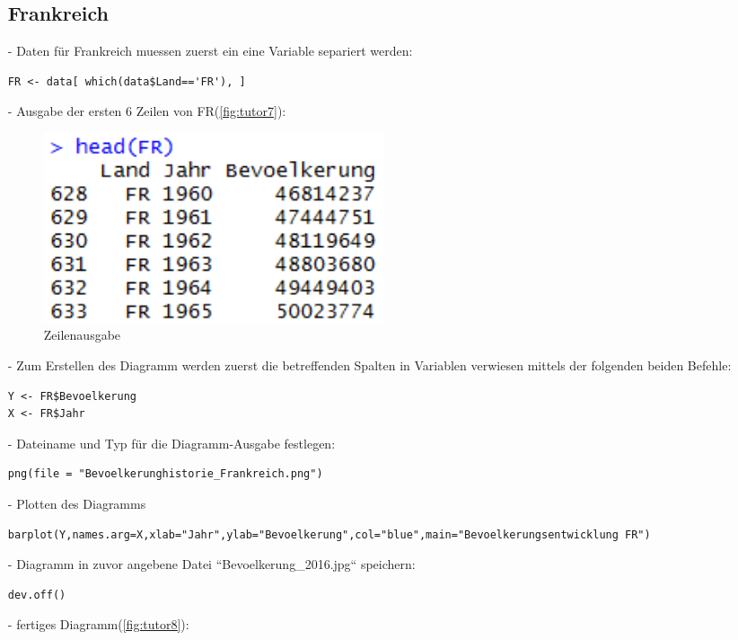 \begin{itemize}
\subsection*{Frankreich}
\item[-]Daten für Frankreich muessen zuerst ein eine Variable separiert werden:
\begin{lstlisting}
FR <- data[ which(data$Land=='FR'), ]
\end{lstlisting}
\item[-]Ausgabe der ersten 6 Zeilen von FR(\autoref{fig:tutor7}):
\begin{figure}[!htb]
        \begin{minipage}{1\textwidth}
                \centering
                \includegraphics[width=0.50\textwidth]{pics/tutor7.png}\par\vspace{0cm}
                \caption{Zeilenausgabe}
                \label{fig:tutor7}
        \end{minipage}
\end{figure}
\item[-]Zum Erstellen des Diagramm werden zuerst die betreffenden Spalten in Variablen verwiesen mittels der folgenden beiden Befehle:
\begin{lstlisting}
Y <- FR$Bevoelkerung
X <- FR$Jahr
\end{lstlisting}
\item[-]Dateiname und Typ für die Diagramm-Ausgabe festlegen:
\begin{lstlisting}
png(file = "Bevoelkerunghistorie_Frankreich.png")
\end{lstlisting}
\item[-]Plotten des Diagramms
\begin{lstlisting}
barplot(Y,names.arg=X,xlab="Jahr",ylab="Bevoelkerung",col="blue",main="Bevoelkerungsentwicklung FR")
\end{lstlisting}
\item[-]Diagramm in zuvor angebene Datei ``Bevoelkerung\_2016.jpg`` speichern:
\begin{lstlisting}
dev.off()
\end{lstlisting}
\item[-]fertiges Diagramm(\autoref{fig:tutor8}):


\end{itemize}
